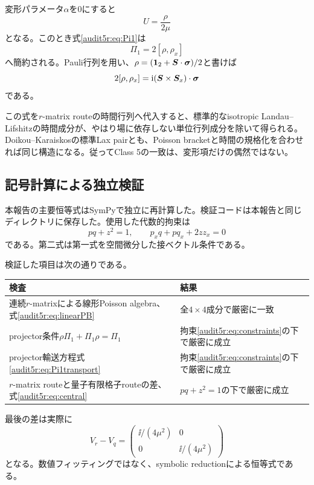 変形パラメータ$\alpha$を0にすると
\[
U=\frac{\rho}{2\mu}
\]
となる。このとき式\eqref{audit5r:eq:Pi1}は
\begin{equation}
\Pi_1=2[\rho,\rho_x]
\end{equation}
へ簡約される。Pauli行列を用い、$\rho=(\mathbf 1_2+\boldsymbol S\cdot\bm\sigma)/2$と書けば
\begin{equation}
2[\rho,\rho_x]
=
\mathrm i(\boldsymbol S\times\boldsymbol S_x)\cdot\bm\sigma
\end{equation}
である。

この式を$r$-matrix routeの時間行列へ代入すると、標準的なisotropic Landau--Lifshitzの時間成分が、やはり場に依存しない単位行列成分を除いて得られる。Doikou--Karaiskosの標準Lax pair\cite{DK}とも、Poisson bracketと時間の規格化を合わせれば同じ構造になる。従ってClass 5の一致は、変形項だけの偶然ではない。

\subsection{記号計算による独立検証}

本報告の主要恒等式はSymPyで独立に再計算した。検証コードは本報告と同じディレクトリに保存した。使用した代数的拘束は
\begin{equation}
pq+z^2=1,
\qquad
p_xq+pq_x+2zz_x=0
\label{audit5r:eq:constraints}
\end{equation}
である。第二式は第一式を空間微分した接ベクトル条件である。

検証した項目は次の通りである。
\begin{longtable}{L{69mm}L{70mm}}
\toprule
検査 & 結果\\
\midrule
\endhead
連続$r$-matrixによる線形Poisson algebra、式\eqref{audit5r:eq:linearPB} & 全$4\times4$成分で厳密に一致\\
projector条件$\rho\Pi_1+\Pi_1\rho=\Pi_1$ & 拘束\eqref{audit5r:eq:constraints}の下で厳密に成立\\
projector輸送方程式\eqref{audit5r:eq:Pi1transport} & 拘束\eqref{audit5r:eq:constraints}の下で厳密に成立\\
$r$-matrix routeと量子有限格子routeの差、式\eqref{audit5r:eq:central} & $pq+z^2=1$の下で厳密に成立\\
\bottomrule
\end{longtable}

最後の差は実際に
\begin{equation}
V_r-V_q
=
\begin{pmatrix}
\ii/(4\mu^2)&0\\
0&\ii/(4\mu^2)
\end{pmatrix}
\end{equation}
となる。数値フィッティングではなく、symbolic reductionによる恒等式である。

